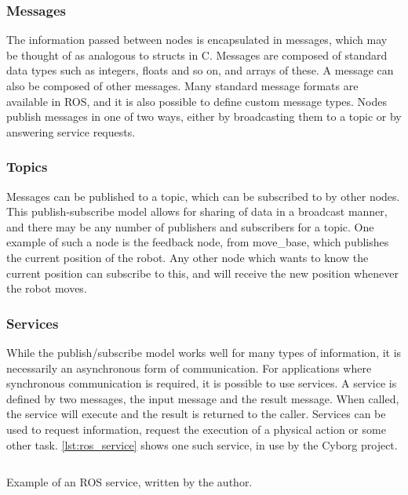 \documentclass[\rootfolder/main.tex]{subfiles}
\begin{document}
\subsubsection{Messages}

The information passed between nodes is encapsulated in messages, which may be thought of as analogous to structs in C.
Messages are composed of standard data types such as integers, floats and so on, and arrays of these.
A message can also be composed of other messages.
Many standard message formats are available in ROS, and it is also possible to define custom message types.
Nodes publish messages in one of two ways, either by broadcasting them to a topic or by answering service requests.

\subsubsection{Topics}

Messages can be published to a topic, which can be subscribed to by other nodes.
This publish-subscribe model allows for sharing of data in a broadcast manner, and there may be any number of publishers and subscribers for a topic.
One example of such a node is the feedback node, from move\_base, which publishes the current position of the robot.
Any other node which wants to know the current position can subscribe to this, and will receive the new position whenever the robot moves.

\subsubsection{Services}

While the publish/subscribe model works well for many types of information, it is necessarily an asynchronous form of communication.
For applications where synchronous communication is required, it is possible to use services.
A service is defined by two messages, the input message and the result message.
When called, the service will execute and the result is returned to the caller.
Services can be used to request information, request the execution of a physical action or some other task.
\cref{lst:ros_service} shows one such service, in use by the Cyborg project.

\begin{listing}
    \inputminted{python}{\rootfolder/Chapters/Chapter2/Listings/distance_to_goal.py}
    \caption{Example of an ROS service, written by the author.}
    \label{lst:ros_service}
\end{listing}
\end{document}
